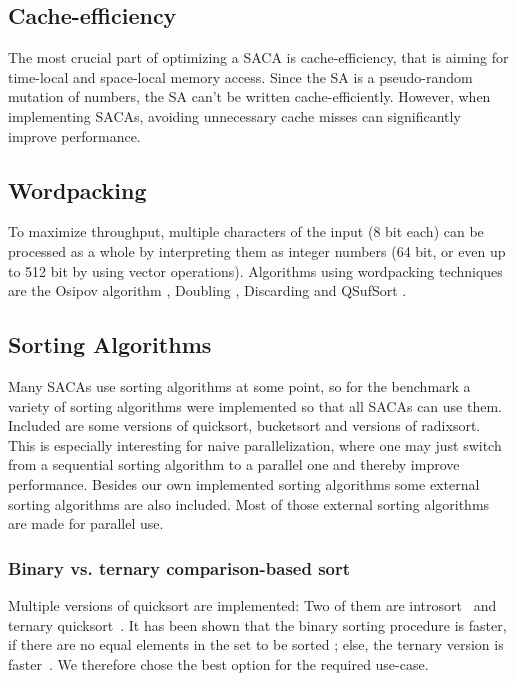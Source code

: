\subsection{Cache-efficiency}

The most crucial part of optimizing a SACA is cache-efficiency, that is aiming for time-local and space-local memory access.
Since the SA is a pseudo-random mutation of numbers, the SA can't be written cache-efficiently.
However, when implementing SACAs, avoiding unnecessary cache misses can significantly improve performance.

\subsection{Wordpacking}

To maximize throughput, multiple characters of the input (8 bit each) can be processed as a whole by
interpreting them as integer numbers (64 bit, or even up to 512 bit by using vector operations).
Algorithms using wordpacking techniques are the Osipov algorithm , Doubling , Discarding  and QSufSort .

\subsection{Sorting Algorithms}

Many SACAs use sorting algorithms at some point, so for the benchmark a variety of sorting algorithms were implemented so that all SACAs can use them. Included are some versions of quicksort, bucketsort and versions of radixsort.  This is especially interesting for naive parallelization, where one may just switch from a sequential sorting algorithm to a parallel one and thereby improve performance.
Besides our own implemented sorting algorithms some external sorting algorithms are also included. Most of those external sorting algorithms are made for parallel use.

\subsubsection{Binary vs. ternary comparison-based sort}

Multiple versions of quicksort are implemented:
Two of them are introsort~\cite{Musser97} and ternary quicksort~\cite{ternary_quicksort}.
It has been shown that the binary sorting procedure is faster,
if there are no equal elements in the set to be sorted ;
else, the ternary version is faster~\cite{ternary_quicksort}.
We therefore chose the best option for the required use-case.

